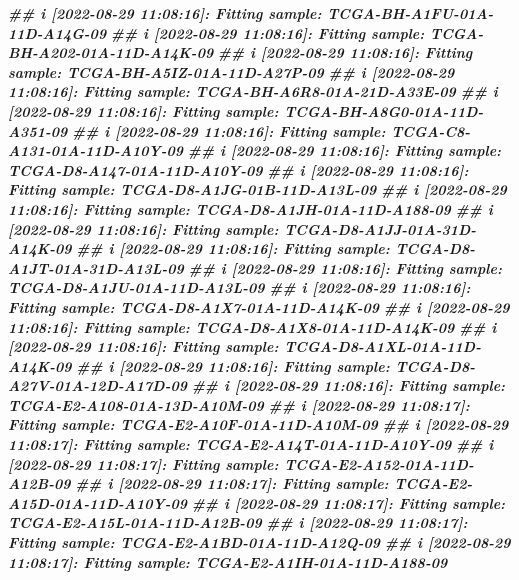 \documentclass[
  12pt,
  a4paper,
  twoside]{book}
\newenvironment{Shaded}{\begin{snugshade}}{\end{snugshade}}
\newcommand{\DocumentationTok}[1]{\textcolor[rgb]{0.56,0.35,0.01}{\textbf{\textit{#1}}}}
\begin{document}
\begin{Shaded}
\begin{Highlighting}[]
\DocumentationTok{\#\# i [2022{-}08{-}29 11:08:16]: Fitting sample: TCGA{-}BH{-}A1FU{-}01A{-}11D{-}A14G{-}09}
\DocumentationTok{\#\# i [2022{-}08{-}29 11:08:16]: Fitting sample: TCGA{-}BH{-}A202{-}01A{-}11D{-}A14K{-}09}
\DocumentationTok{\#\# i [2022{-}08{-}29 11:08:16]: Fitting sample: TCGA{-}BH{-}A5IZ{-}01A{-}11D{-}A27P{-}09}
\DocumentationTok{\#\# i [2022{-}08{-}29 11:08:16]: Fitting sample: TCGA{-}BH{-}A6R8{-}01A{-}21D{-}A33E{-}09}
\DocumentationTok{\#\# i [2022{-}08{-}29 11:08:16]: Fitting sample: TCGA{-}BH{-}A8G0{-}01A{-}11D{-}A351{-}09}
\DocumentationTok{\#\# i [2022{-}08{-}29 11:08:16]: Fitting sample: TCGA{-}C8{-}A131{-}01A{-}11D{-}A10Y{-}09}
\DocumentationTok{\#\# i [2022{-}08{-}29 11:08:16]: Fitting sample: TCGA{-}D8{-}A147{-}01A{-}11D{-}A10Y{-}09}
\DocumentationTok{\#\# i [2022{-}08{-}29 11:08:16]: Fitting sample: TCGA{-}D8{-}A1JG{-}01B{-}11D{-}A13L{-}09}
\DocumentationTok{\#\# i [2022{-}08{-}29 11:08:16]: Fitting sample: TCGA{-}D8{-}A1JH{-}01A{-}11D{-}A188{-}09}
\DocumentationTok{\#\# i [2022{-}08{-}29 11:08:16]: Fitting sample: TCGA{-}D8{-}A1JJ{-}01A{-}31D{-}A14K{-}09}
\DocumentationTok{\#\# i [2022{-}08{-}29 11:08:16]: Fitting sample: TCGA{-}D8{-}A1JT{-}01A{-}31D{-}A13L{-}09}
\DocumentationTok{\#\# i [2022{-}08{-}29 11:08:16]: Fitting sample: TCGA{-}D8{-}A1JU{-}01A{-}11D{-}A13L{-}09}
\DocumentationTok{\#\# i [2022{-}08{-}29 11:08:16]: Fitting sample: TCGA{-}D8{-}A1X7{-}01A{-}11D{-}A14K{-}09}
\DocumentationTok{\#\# i [2022{-}08{-}29 11:08:16]: Fitting sample: TCGA{-}D8{-}A1X8{-}01A{-}11D{-}A14K{-}09}
\DocumentationTok{\#\# i [2022{-}08{-}29 11:08:16]: Fitting sample: TCGA{-}D8{-}A1XL{-}01A{-}11D{-}A14K{-}09}
\DocumentationTok{\#\# i [2022{-}08{-}29 11:08:16]: Fitting sample: TCGA{-}D8{-}A27V{-}01A{-}12D{-}A17D{-}09}
\DocumentationTok{\#\# i [2022{-}08{-}29 11:08:16]: Fitting sample: TCGA{-}E2{-}A108{-}01A{-}13D{-}A10M{-}09}
\DocumentationTok{\#\# i [2022{-}08{-}29 11:08:17]: Fitting sample: TCGA{-}E2{-}A10F{-}01A{-}11D{-}A10M{-}09}
\DocumentationTok{\#\# i [2022{-}08{-}29 11:08:17]: Fitting sample: TCGA{-}E2{-}A14T{-}01A{-}11D{-}A10Y{-}09}
\DocumentationTok{\#\# i [2022{-}08{-}29 11:08:17]: Fitting sample: TCGA{-}E2{-}A152{-}01A{-}11D{-}A12B{-}09}
\DocumentationTok{\#\# i [2022{-}08{-}29 11:08:17]: Fitting sample: TCGA{-}E2{-}A15D{-}01A{-}11D{-}A10Y{-}09}
\DocumentationTok{\#\# i [2022{-}08{-}29 11:08:17]: Fitting sample: TCGA{-}E2{-}A15L{-}01A{-}11D{-}A12B{-}09}
\DocumentationTok{\#\# i [2022{-}08{-}29 11:08:17]: Fitting sample: TCGA{-}E2{-}A1BD{-}01A{-}11D{-}A12Q{-}09}
\DocumentationTok{\#\# i [2022{-}08{-}29 11:08:17]: Fitting sample: TCGA{-}E2{-}A1IH{-}01A{-}11D{-}A188{-}09}

\end{Highlighting}
\end{Shaded}
\end{document}
